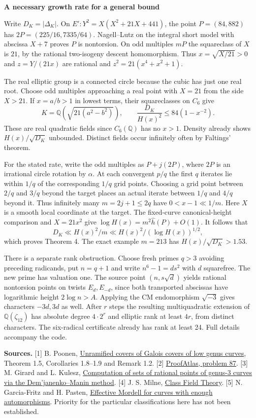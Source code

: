 \documentclass[12pt]{article}
\newcommand{\Q}{\mathbb Q}\newcommand{\Z}{\mathbb Z}\newcommand{\C}{C_6}
\newcommand{\heading}[1]{{\Large\bfseries\color{ink}#1}\par\smallskip}
\begin{document}
\newpage
\heading{A necessary growth rate for a general bound}
Write $D_K=|\Delta_K|$. On $E':Y^2=X(X^2+21X+441)$, the point $P=(84,882)$ has $2P=(225/16,7335/64)$. Nagell--Lutz on the integral short model with abscissa $X+7$ proves $P$ is nontorsion. On odd multiples $mP$ the squareclass of $X$ is $21$, by the rational two-isogeny descent homomorphism. Thus $x=\sqrt{X/21}>0$ and $z=Y/(21x)$ are rational and $z^2=21(x^4+x^2+1)$.

The real elliptic group is a connected circle because the cubic has just one real root. Choose odd multiples approaching a real point with $X=21$ from the side $X>21$. If $x=a/b>1$ in lowest terms, their squareclasses on $\C$ give
\[
  K=\Q(\sqrt{21(a^2-b^2)}),\qquad
  \frac{D_K}{H(x)^2}\le 84(1-x^{-2}).
\]
These are real quadratic fields since $\C(\Q)$ has no $x>1$. Density already shows $H(x)/\sqrt{D_K}$ unbounded. Distinct fields occur infinitely often by Faltings' theorem.

For the stated rate, write the odd multiples as $P+j(2P)$, where $2P$ is an irrational circle rotation by $\alpha$. At each convergent $p/q$ the first $q$ iterates lie within $1/q$ of the corresponding $1/q$ grid points. Choosing a grid point between $2/q$ and $3/q$ beyond the target places an actual iterate between $1/q$ and $4/q$ beyond it. Thus infinitely many $m=2j+1\le2q$ have $0<x-1\ll1/m$. Here $X$ is a smooth local coordinate at the target. The fixed-curve canonical-height comparison and $X=21x^2$ give $\log H(x)=m^2\widehat h(P)+O(1)$. It follows that
\[
    D_K\ll H(x)^2/m\ll H(x)^2/(\log H(x))^{1/2},
\]
which proves Theorem 4. The exact example $m=213$ has $H(x)/\sqrt{D_K}>1.53$.

There is a separate rank obstruction. Choose fresh primes $q>3$ avoiding preceding radicands, put $n=q+1$ and write $n^6-1=ds^2$ with $d$ squarefree. The new prime has valuation one. The source point $(n,s\sqrt d)$ yields rational nontorsion points on twists $E_d,E_{-d}$, since both transported abscissas have logarithmic height $2\log n>A$. Applying the CM endomorphism $\sqrt{-3}$ gives characters $-3d,3d$ as well. After $r$ steps the resulting multiquadratic extension of $\Q(\zeta_{12})$ has absolute degree $4\cdot2^r$ and elliptic rank at least $4r$, from distinct characters. The six-radical certificate already has rank at least 24. Full details accompany the code.

{\small\textbf{Sources.} [1] B. Poonen, \href{https://math.mit.edu/~poonen/papers/etale.pdf}{Unramified covers of Galois covers of low genus curves}, Theorem 1.5, Corollaries 1.8--1.9 and Remark 1.2. [2] \href{https://www.proofatlas.ai/open-problems/}{ProofAtlas, problem 87}. [3] M. Girard and L. Kulesz, \href{https://www.cambridge.org/core/journals/lms-journal-of-computation-and-mathematics/article/computation-of-sets-of-rational-points-of-genus3-curves-via-the-demjanenkomanin-method/9C0415EF619474507379844F76E6DF84}{Computation of sets of rational points of genus-3 curves via the Dem'janenko--Manin method}. [4] J. S. Milne, \href{https://jmilne.org/math/CourseNotes/CFT.pdf}{Class Field Theory}. [5] N. Garcia-Fritz and H. Pasten, \href{https://arxiv.org/abs/2503.10443}{Effective Mordell for curves with enough automorphisms}. Priority for the particular classifications here has not been established.}
\end{document}
